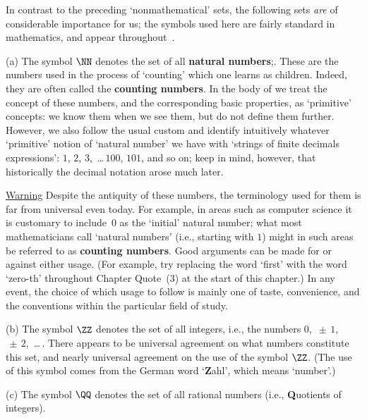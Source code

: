 \V


        In contrast to the preceding `nonmathematical' sets, the following sets {\em are} of considerable importance for us;
    the symbols used here are fairly standard in mathematics, and appear throughout~{\TheseNotes}.

\V

        (a) The symbol ${\NN}$ denotes the set of all {\bf natural numbers};.
    These are the numbers used in the process of `counting' which one learns as children.
    Indeed, they are often called the {\bf counting numbers}.
    In the body of {\ThisText} we treat the concept of these numbers, and the corresponding basic properties,
    as `primitive' concepts: we know them when we see them, but do not define them further.
    However, we also follow the usual custom and identify intuitively whatever `primitive' notion of `natural number' we have with
    `strings of finite decimals expressions': $1$, $2$, $3$, \,{\ldots}\,$100$, $101$, and so on; keep in mind, however, that historically the decimal notation arose much later.

        \underline{Warning} Despite the antiquity of these numbers, the terminology used for them is far from universal even today.
    For example, in areas such as computer science it is customary to include~$0$ as the `initial' natural number;
    what most mathematicians call `natural numbers' (i.e., starting with $1$) might in such areas be referred to as {\bf counting numbers}.
    Good arguments can be made for or against either usage. (For example, try replacing the word
    `first' with the word `zero-th' throughout Chapter Quote~(3) at the start of this chapter.)
    In any event, the choice of which usage to follow is mainly one of taste, convenience, and the conventions within the particular field of study.

\V

        (b) The symbol ${\ZZ}$ denotes the set of all integers, i.e., the numbers $0$,  $\,{\pm}\, 1$, $ \,{\pm}\, 2$, \,{\ldots}\,.
    There appears to be universal agreement on what numbers constitute this set, and nearly universal agreement on the use of the symbol ${\ZZ}$.
    (The use of this symbol comes from the German word `{\bf Z}ahl', which means `number'.)

\V

        (c) The symbol ${\QQ}$ denotes the set of all rational numbers (i.e., {\bf Q}uotients of integers).

